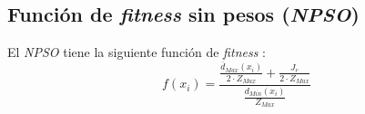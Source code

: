 \subsection{Función de \emph{fitness} sin pesos (\emph{NPSO})}\label{sect:inpso}
    El \emph{NPSO} tiene la siguiente función de \emph{fitness} \cite{PSO_0}:
\begin{equation}\label{pso: npso}
    f(x_i) = \displaystyle \frac{\displaystyle\frac{\overline{d}_{Max}(x_i)}{2 \cdot Z_{Max}} + \frac{J_e}{2 \cdot Z_{Max}}}{\displaystyle\frac{d_{Min}(x_i)}{Z_{Max}}}
\end{equation}


